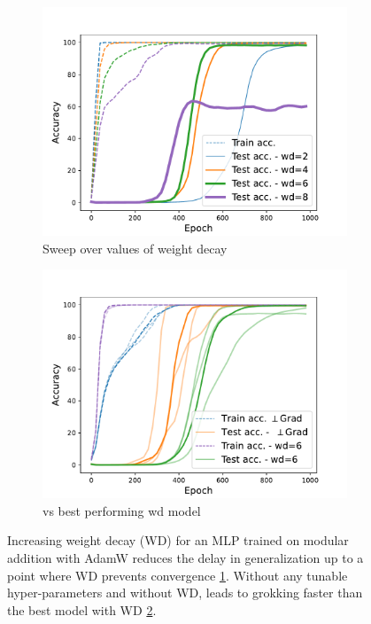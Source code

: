 \begin{figure}[t]
    \vspace{-5mm}
    \centering
    \begin{subfigure}{.48\textwidth}
    \includegraphics[width=\linewidth]{grokking_iclr_arxiv/figures/weight_decay_sweep.pdf}
        \caption{Sweep over values of weight decay}
        \label{fig:wd_sweep}
    \end{subfigure}
    \begin{subfigure}{.48\textwidth}
    \includegraphics[width=\linewidth]{grokking_iclr_arxiv/figures/weight_decay_vs_orthograd_seeds.pdf}
        \caption{\ograd vs best performing wd model}
        \label{fig:vs_wd_seeds}
    \end{subfigure}
    \caption{Increasing weight decay (WD) for an MLP trained on modular addition with AdamW reduces the delay in generalization up to a point where WD prevents convergence \cref{fig:wd_sweep}. Without any tunable hyper-parameters and without WD, \ograd leads to grokking faster than the best model with WD \cref{fig:vs_wd_seeds}.}
    \label{fig:wd_vs_ortho}
\end{figure}

